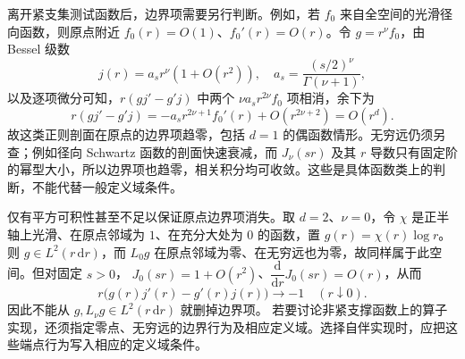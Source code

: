 离开紧支集测试函数后，边界项需要另行判断。例如，若
\(f_0\) 来自全空间的光滑径向函数，则原点附近
\(f_0(r)=O(1)\)、\(f_0'(r)=O(r)\)。令 \(g=r^\nu f_0\)，由
Bessel 级数
\[
 j(r)=a_s r^\nu(1+O(r^2)),
 \quad a_s=\frac{(s/2)^\nu}{\Gamma(\nu+1)},
\]
以及逐项微分可知，\(r(gj'-g'j)\) 中两个
\(\nu a_s r^{2\nu}f_0\) 项相消，余下为
\[
 r(gj'-g'j)
 =-a_s r^{2\nu+1}f_0'(r)+O(r^{2\nu+2})
 =O(r^d).
\]
故这类正则剖面在原点的边界项趋零，包括 \(d=1\) 的偶函数情形。无穷远仍须另查；例如径向 Schwartz 函数的剖面快速衰减，而
\(J_\nu(sr)\) 及其 \(r\) 导数只有固定阶的幂型大小，所以边界项也趋零，相关积分均可收敛。这些是具体函数类上的判断，不能代替一般定义域条件。

\ProseParagraphBreak

仅有平方可积性甚至不足以保证原点边界项消失。取 \(d=2\)、\(\nu=0\)，令 \(\chi\) 是正半轴上光滑、在原点邻域为 \(1\)、在充分大处为 \(0\) 的函数，置
\(g(r)=\chi(r)\log r\)。则 \(g\in L^2(r\,\mathrm dr)\)，而
\(L_0g\) 在原点邻域为零、在无穷远也为零，故同样属于此空间。但对固定 \(s>0\)，
\(J_0(sr)=1+O(r^2)\)、\(\dfrac{\mathrm d}{\mathrm dr}J_0(sr)=O(r)\)，从而
\[
 r\bigl(g(r)j'(r)-g'(r)j(r)\bigr)\longrightarrow-1
 \quad(r\downarrow0).
\]
因此不能从 \(g,L_\nu g\in L^2(r\,\mathrm dr)\) 就删掉边界项。
若要讨论非紧支撑函数上的算子实现，还须指定零点、无穷远的边界行为及相应定义域。选择自伴实现时，应把这些端点行为写入相应的定义域条件。
